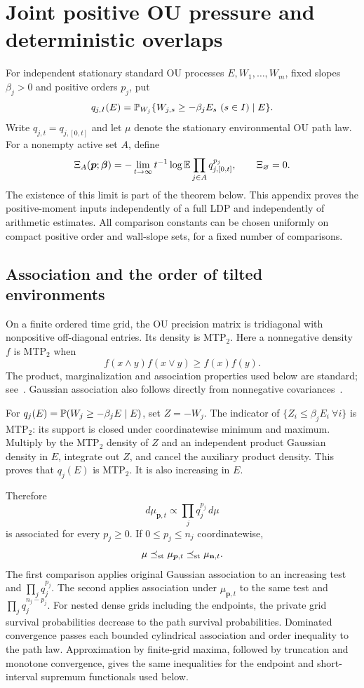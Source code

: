 \section{Joint positive OU pressure and deterministic overlaps}\label{fp:app:joint}
For independent stationary standard OU processes $E,W_1,\ldots,W_m$, fixed slopes $\beta_j>0$ and positive orders $p_j$, put
\[
 q_{j,I}(E)=\PP_{W_j}\{W_{j,s}\ge-\beta_jE_s\ (s\in I)\mid E\}.
\]
Write $q_{j,t}=q_{j,[0,t]}$ and let $\mu$ denote the stationary environmental OU path law. For a nonempty active set $A$, define
\begin{equation}\label{fp:eq:joint-pressure}
 \Xi_A(\boldsymbol p;\boldsymbol\beta)
 =-\lim_{t\to\infty}t^{-1}\log\mathbb E\prod_{j\in A}q_{j,[0,t]}^{p_j},
 \qquad \Xi_\varnothing=0.
\end{equation}
The existence of this limit is part of the theorem below. This appendix proves the positive-moment inputs independently of a full LDP and independently of arithmetic estimates. All comparison constants can be chosen uniformly on compact positive order and wall-slope sets, for a fixed number of comparisons.

\subsection{Association and the order of tilted environments}
On a finite ordered time grid, the OU precision matrix is tridiagonal with nonpositive off-diagonal entries. Its density is MTP$_2$. Here a nonnegative density $f$ is MTP$_2$ when
\[
 f(x\wedge y)f(x\vee y)\ge f(x)f(y).
\]
The product, marginalization and association properties used below are standard; see~\cite[Proposition~3.4 and Section~3, especially equation~(3.5)]{Fallat}. Gaussian association also follows directly from nonnegative covariances~\cite{Pitt}.

For $q_j(E)=\mathbb P(W_j\ge-\beta_jE\mid E)$, set $Z=-W_j$. The indicator of $\{Z_i\le\beta_jE_i\ \forall i\}$ is MTP$_2$: its support is closed under coordinatewise minimum and maximum. Multiply by the MTP$_2$ density of $Z$ and an independent product Gaussian density in $E$, integrate out $Z$, and cancel the auxiliary product density. This proves that $q_j(E)$ is MTP$_2$. It is also increasing in $E$.

Therefore
\[
 d\mu_{\boldsymbol p,t}\propto\prod_jq_j^{p_j}\,d\mu
\]
is associated for every $p_j\ge0$. If $0\le p_j\le n_j$ coordinatewise,
\begin{equation}\label{fp:eq:tilt-order}
 \mu\preceq_{\rm st}\mu_{\boldsymbol p,t}\preceq_{\rm st}\mu_{\mathbf n,t}.
\end{equation}
The first comparison applies original Gaussian association to an increasing test and $\prod_jq_j^{p_j}$. The second applies association under $\mu_{\boldsymbol p,t}$ to the same test and $\prod_jq_j^{n_j-p_j}$. For nested dense grids including the endpoints, the private grid survival probabilities decrease to the path survival probabilities. Dominated convergence passes each bounded cylindrical association and order inequality to the path law. Approximation by finite-grid maxima, followed by truncation and monotone convergence, gives the same inequalities for the endpoint and short-interval supremum functionals used below.

